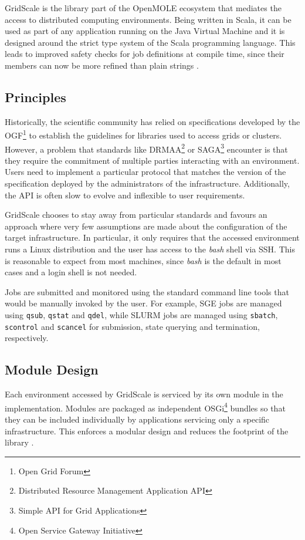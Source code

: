 GridScale is the library part of the OpenMOLE ecosystem that mediates the access to distributed computing environments. Being written in Scala, it can be used as part of any application running on the Java Virtual Machine and it is designed around the strict type system of the Scala programming language. This leads to improved safety checks for job definitions at compile time, since their members can now be more refined than plain strings \cite{Reuillon2016}.

\subsection{Principles}

Historically, the scientific community has relied on specifications developed by the OGF\footnote{Open Grid Forum} \cite{OGF} to establish the guidelines for libraries used to access grids or clusters. However, a problem that standards like DRMAA\footnote{Distributed Resource Management Application API} \cite{DRMAA} or SAGA\footnote{Simple API for Grid Applications} \cite{SAGA} encounter is that they require the commitment of multiple parties interacting with an environment. Users need to implement a particular protocol that matches the version of the specification deployed by the administrators of the infrastructure. Additionally, the API is often slow to evolve and inflexible to user requirements.

GridScale chooses to stay away from particular standards and favours an approach where very few assumptions are made about the configuration of the target infrastructure. In particular, it only requires that the accessed environment runs a Linux distribution and the user has access to the \textit{bash} shell via SSH. This is reasonable to expect from most machines, since \textit{bash} is the default in most cases and a login shell is not needed. 

Jobs are submitted and monitored using the standard command line tools that would be manually invoked by the user. For example, SGE jobs are managed using \verb|qsub|, \verb|qstat| and \verb|qdel|, while SLURM jobs are managed using \verb|sbatch|, \verb|scontrol| and \verb|scancel| for submission, state querying and termination, respectively.

\subsection{Module Design}

Each environment accessed by GridScale is serviced by its own module in the implementation. Modules are packaged as independent OSGi\footnote{Open Service Gateway Initiative} \cite{OSGi} bundles so that they can be included individually by applications servicing only a specific infrastructure. This enforces a modular design and reduces the footprint of the library \cite{Reuillon2016}.

